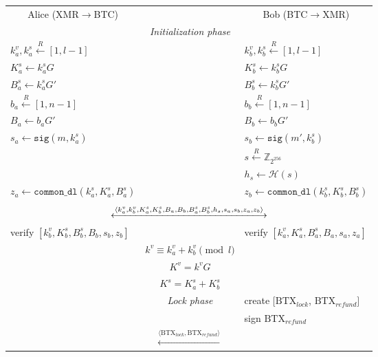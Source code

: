 \documentclass{llncs}
\renewcommand{\arraystretch}{1.5}
\begin{document}
\begin{figure}[H]
    \begin{table}[H]
        \centering
      {\renewcommand{\arraystretch}{1.1}%
      \begin{tabular}{ | l c l | }
        \hline
          \multicolumn{1}{|c}{Alice (XMR$\rightarrow$BTC)} &  & \multicolumn{1}{c|}{Bob (BTC$\rightarrow$XMR)} \\
          & \textit{Initialization phase} & \\
          $k^v_a, k^s_a \xleftarrow{R} [1, l-1]$ & & $k^v_b, k^s_b \xleftarrow{R} [1, l-1]$ \\
          $K^s_a \leftarrow k^s_aG$ & & $K^s_b \leftarrow k^s_bG$ \\
          $B^s_a \leftarrow k^s_aG'$ & & $B^s_b \leftarrow k^s_bG'$ \\
          $b_a \xleftarrow{R} [1, n-1]$ & & $b_b \xleftarrow{R} [1, n-1]$ \\
          $B_a \leftarrow b_aG'$ & & $B_b \leftarrow b_bG'$ \\
          $s_a \leftarrow \texttt{sig}(m, k^s_a)$ & & $s_b \leftarrow \texttt{sig}(m', k^s_b)$ \\
          & & $s \xleftarrow{R} \mathbb{Z}_{2^{256}}$ \\
          & & $h_s \leftarrow \mathcal{H}(s)$ \\
          $z_a \leftarrow \texttt{common\_dl}(k^s_a, K^s_a, B^s_a)$ & & $z_b \leftarrow \texttt{common\_dl}(k^s_b, K^s_b, B^s_b)$ \\
           & & \\
          \multicolumn{3}{|c|}{$\xlongleftrightarrow{\langle k^v_a, k^v_b, K^s_a, K^s_b, B_a, B_b, B^s_a, B^s_b, h_s, s_a, s_b, z_a, z_b \rangle}$} \\
          verify $[k^v_b, K^s_b, B^s_b, B_b, s_b, z_b]$ & & verify $[k^v_a, K^s_a, B^s_a, B_a, s_a, z_a]$ \\
          & $k^v \equiv k^v_a + k^v_b \pmod l$ & \\
          & $K^v = k^vG$ & \\
          & $K^s = K^s_a + K^s_b$ & \\
          & \textit{Lock phase} & create $[\text{BTX}_\textit{lock}$, $\text{BTX}_\textit{refund}]$ \\
          & & sign $\text{BTX}_\textit{refund}$ \\
          \multicolumn{3}{|c|}{$\xleftarrow{\langle \text{BTX}_\textit{lock}, \text{BTX}_\textit{refund} \rangle}$} \\

\end{tabular}}
\end{table}
\end{figure}
\end{document}
